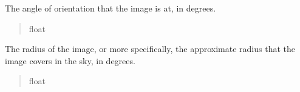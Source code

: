 \documentclass[letterpaper,11pt,english]{sphinxmanual}
\begin{document}
\begin{savenotes}
\begin{fulllineitems}
\begin{savenotes}
\begin{fulllineitems}
\begin{quote}
\begin{description}
\end{description}\end{quote}

\end{fulllineitems}\end{savenotes}


\begin{savenotes}\begin{fulllineitems}
\label{\detokenize{code/opihiexarata.astrometry.solution:opihiexarata.astrometry.solution.AstrometricSolution.orientation}}
\pysigstartsignatures
{}
\pysigstopsignatures
\sphinxAtStartPar
The angle of orientation that the image is at, in degrees.
\begin{quote}\begin{description}
\sphinxAtStartPar
float

\end{description}\end{quote}

\end{fulllineitems}\end{savenotes}


\begin{savenotes}\begin{fulllineitems}
\label{\detokenize{code/opihiexarata.astrometry.solution:opihiexarata.astrometry.solution.AstrometricSolution.radius}}
\pysigstartsignatures
{}
\pysigstopsignatures
\sphinxAtStartPar
The radius of the image, or more specifically, the approximate radius
that the image covers in the sky, in degrees.
\begin{quote}\begin{description}
\sphinxAtStartPar
float

\end{description}\end{quote}

\end{fulllineitems}\end{savenotes}


\end{fulllineitems}
\end{savenotes}
\end{document}
